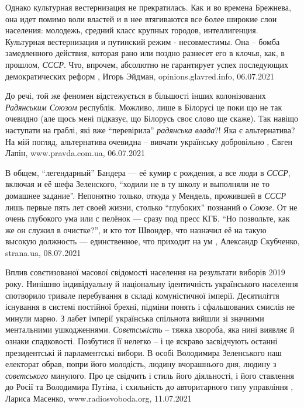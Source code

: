 Однако культурная вестернизация не прекратилась. Как и во времена Брежнева, она
идет помимо воли властей и в нее втягиваются все более широкие слои населения:
молодежь, средний класс крупных городов, интеллигенция.
Культурная вестернизация и путинский режим - несовместимы. Она – бомба
замедленного действия, которая рано или поздно разнесет его в клочья, как, в
прошлом, \emph{СССР}. Что, впрочем, абсолютно не гарантирует успех последующих
демократических реформ
, 
Игорь Эйдман, opinions.glavred.info, 06.07.2021

До речі, той же феномен відстежується в більшості інших колонізованих
\emph{Радянським Союзом} республік. Можливо, лише в Білорусі це поки що не так
очевидно (але щось мені підказує, що Білорусь своє слово ще скаже). Так навіщо
наступати на граблі, які вже \enquote{перевірила} \emph{радянська влада}?!  Яка
є альтернатива? На мій погляд, альтернатива очевидна – вивчати українську
добровільно
, 
Євген Лапін, www.pravda.com.ua, 06.07.2021

В общем, \enquote{легендарный} Бандера — её кумир с рождения, а все люди в
\emph{СССР}, включая и её шефа Зеленского, \enquote{ходили не в ту школу и выполняли
не то домашнее задание}. Непонятно только, откуда у Мендель, прожившей в \emph{СССР}
лишь первые пять лет своей жизни, столько \enquote{глубоких} познаний о \emph{Союзе}.
От не очень глубокого ума или с пелёнок — сразу под пресс КГБ. \enquote{Но
позвольте, как же он служил в очистке?}, и кто тот Швондер, что назначил её на
такую высокую должность — единственное, что приходит на ум
, 
Александр Скубченко, strana.ua, 08.07.2021


Вплив совєтизованої масової свідомості населення на результати виборів 2019
року.  Нинішню індивідуальну й національну ідентичність українського населення
спотворило тривале перебування в складі комуністичної імперії.  Десятиліття
існування в системі постійної брехні, підміни понять і сфальшованих смислів не
минули марно. З лабет імперії українська спільнота вийшли зі значними
ментальними ушкодженнями.  \emph{Совєтськість} – тяжка хвороба, яка нині виявляє й
ознаки спадковості. Позбутися її нелегко – і це яскраво засвідчують останні
президентські й парламентські вибори.  В особі Володимира Зеленського наш
електорат обрав, попри його молодість, людину вчорашнього дня, людину з
\emph{совєтського} минулого. Про це свідчить і стиль його діяльності, і його ставлення
до Росії та Володимира Путіна, і схильність до авторитарного типу управління
, 
Лариса Масенко, www.radiosvoboda.org, 11.07.2021

